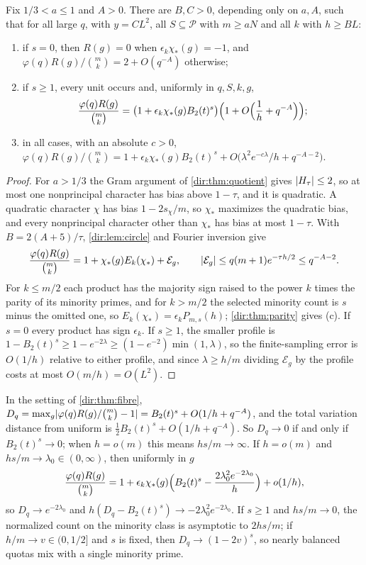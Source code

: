 \begin{theorem}\label{dir:thm:fibre}
Fix $1/3<a\le1$ and $A>0$. There are $B,C>0$, depending only on $a,A$, such that for all large $q$, with
$y=CL^2$, all $S\subseteq\mathcal P$ with $m\ge aN$ and all $k$ with $h\ge BL$:
\begin{enumerate}[label=\textup{(\alph*)}]
\item if $s=0$, then $R(g)=0$ when $\epsilon_k\chi_*(g)=-1$, and $\varphi(q)R(g)/\binom mk=2+O(q^{-A})$
otherwise;
\item if $s\ge1$, every unit occurs and, uniformly in $q,S,k,g$,
\[
 \frac{\varphi(q)R(g)}{\binom mk}=\bigl(1+\epsilon_k\chi_*(g)B_2(t)^s\bigr)\Bigl(1+O\Bigl(\frac1h+q^{-A}\Bigr)\Bigr);
\]
\item in all cases, with an absolute $c>0$,
$\varphi(q)R(g)/\binom mk=1+\epsilon_k\chi_*(g)B_2(t)^s+O\bigl(\lambda^2e^{-c\lambda}/h+q^{-A-2}\bigr)$.
\end{enumerate}
\end{theorem}

\begin{proof}
For $a>1/3$ the Gram argument of \cref{dir:thm:quotient} gives $\lvert H_\tau\rvert\le2$, so at most one
nonprincipal character has bias above $1-\tau$, and it is quadratic. A quadratic character $\chi$ has bias
$1-2s_\chi/m$, so $\chi_*$ maximizes the quadratic bias, and every nonprincipal character other than
$\chi_*$ has bias at most $1-\tau$. With $B=2(A+5)/\tau$, \cref{dir:lem:circle} and Fourier inversion give
\[
 \frac{\varphi(q)R(g)}{\binom mk}=1+\chi_*(g)E_k(\chi_*)+\mathcal E_g,\qquad\lvert\mathcal E_g\rvert\le q(m+1)e^{-\tau h/2}\le q^{-A-2}.
\]
For $k\le m/2$ each product has the majority sign raised to the power $k$ times the parity of its minority
primes, and for $k>m/2$ the selected minority count is $s$ minus the omitted one, so
$E_k(\chi_*)=\epsilon_kP_{m,s}(h)$; \cref{dir:thm:parity} gives (c). If $s=0$ every product has sign
$\epsilon_k$. If $s\ge1$, the smaller profile is $1-B_2(t)^s\ge1-e^{-2\lambda}\ge(1-e^{-2})\min(1,\lambda)$,
so the finite-sampling error is $O(1/h)$ relative to either profile, and since $\lambda\ge h/m$ dividing
$\mathcal E_g$ by the profile costs at most $O(m/h)=O(L^2)$.
\end{proof}

\begin{corollary}\label{dir:cor:fibre}
In the setting of \cref{dir:thm:fibre}, $D_q=\max_g\lvert\varphi(q)R(g)/\binom mk-1\rvert=B_2(t)^s+O(1/h+q^{-A})$, and
the total variation distance from uniform is $\frac12B_2(t)^s+O(1/h+q^{-A})$. So $D_q\to0$ if and only
if $B_2(t)^s\to0$; when $h=o(m)$ this means $hs/m\to\infty$. If $h=o(m)$ and $hs/m\to\lambda_0\in(0,\infty)$,
then uniformly in $g$
\[
 \frac{\varphi(q)R(g)}{\binom mk}=1+\epsilon_k\chi_*(g)\Bigl(B_2(t)^s-\frac{2\lambda_0^2e^{-2\lambda_0}}h\Bigr)+o(1/h),
\]
so $D_q\to e^{-2\lambda_0}$ and $h(D_q-B_2(t)^s)\to-2\lambda_0^2e^{-2\lambda_0}$. If $s\ge1$ and $hs/m\to0$,
the normalized count on the minority class is asymptotic to $2hs/m$; if $h/m\to v\in(0,1/2]$ and $s$ is
fixed, then $D_q\to(1-2v)^s$, so nearly balanced quotas mix with a single minority prime.
\end{corollary}

